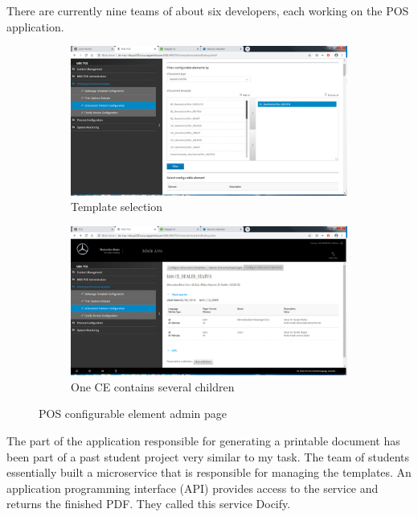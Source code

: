 There are currently nine teams of about six developers, each working on the POS application.

\begin{figure}
  \begin{subfigure}[b]{0.5\linewidth}
    \includegraphics[width=\linewidth]{assets/pos-ce-config-1.png}
    \caption{Template selection}
    \label{fig:pos:a}
  \end{subfigure}
  \begin{subfigure}[b]{0.5\linewidth}
    \includegraphics[width=\linewidth]{assets/pos-ce-config-3.png}
    \caption{One CE contains several children}
    \label{fig:pos:b}
  \end{subfigure}
  \caption{POS configurable element admin page}
  \label{fig:pos}
\end{figure}

The part of the application responsible for generating a printable document has been part of a past student project very similar to my task. The team of students essentially built a microservice that is responsible for managing the templates. An application programming interface (API) provides access to the service and returns the finished PDF. They called this service Docify.

